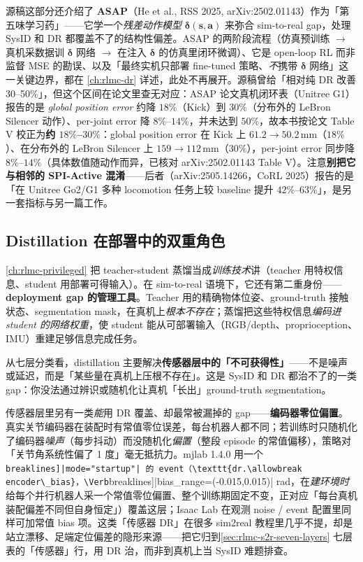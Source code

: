 源稿这部分还介绍了 \textbf{ASAP}（He et al., RSS 2025, arXiv:2502.01143）作为「第五味学习药」——它学一个\emph{残差动作模型} $\boldsymbol\delta(\mathbf s,\mathbf a)$ 来弥合 sim-to-real gap，处理 SysID 和 DR 都覆盖不了的结构性偏差。ASAP 的两阶段流程（仿真预训练 $\to$ 真机采数据训 $\boldsymbol\delta$ 网络 $\to$ 在注入 $\boldsymbol\delta$ 的仿真里闭环微调）、它是 open-loop RL 而非监督 MSE 的勘误、以及「最终实机只部署 fine-tuned 策略、\emph{不}携带 $\boldsymbol\delta$ 网络」这一关键边界，都在 \cref{ch:rlmc-dr} 详述，此处不再展开。源稿曾给「相对纯 DR 改善 30--50\%」，但这个区间在论文里查无对应：ASAP 论文真机闭环表（Unitree G1）报告的是 \emph{global position error} 约降 $18\%$（Kick）到 $30\%$（分布外的 LeBron Silencer 动作）、per-joint error 降 $8\%$--$14\%$，并未达到 $50\%$，故本书按论文 Table V 校正为\textbf{约 $18\%$--$30\%$}：global position error 在 Kick 上 $61.2\!\to\!50.2$\,mm（$18\%$）、在分布外的 LeBron Silencer 上 $159\!\to\!112$\,mm（$30\%$），per-joint error 同步降 $8\%$--$14\%$（具体数值随动作而异，已核对 arXiv:2502.01143 Table V）。注意\textbf{别把它与相邻的 SPI-Active 混淆}——后者（arXiv:2505.14266，CoRL 2025）报告的是「在 Unitree Go2/G1 多种 locomotion 任务上较 baseline 提升 $42\%$--$63\%$」，是另一套指标与另一篇工作。

\subsection{Distillation 在部署中的双重角色}
\label{sec:rlmc-s2r-distill}

\cref{ch:rlmc-privileged} 把 teacher-student 蒸馏当成\emph{训练技术}讲（teacher 用特权信息、student 用部署可得输入）。在 sim-to-real 语境下，它还有第二重身份——\textbf{deployment gap 的管理工具}。Teacher 用的精确物体位姿、ground-truth 接触状态、segmentation mask，在真机上\emph{根本不存在}；蒸馏把这些特权信息\emph{编码进 student 的网络权重}，使 student 能从可部署输入（RGB/depth、proprioception、IMU）重建足够信息完成任务。

从七层分类看，distillation 主要解决\textbf{传感器层中的「不可获得性」}——不是噪声或延迟，而是「某些量在真机上压根不存在」。这是 SysID 和 DR 都治不了的一类 gap：你没法通过辨识或随机化让真机「长出」ground-truth segmentation。

\begin{finenote}
传感器层里另有一类\emph{能}用 DR 覆盖、却最常被漏掉的 gap——\textbf{编码器零位偏置}。真实关节编码器在装配时有常值零位误差，每台机器人都不同；若训练时只随机化了编码器\emph{噪声}（每步抖动）而没随机化\emph{偏置}（整段 episode 的常值偏移），策略对「关节角系统性偏了 1 度」毫无抵抗力。mjlab 1.4.0 用一个 \Verb[breaklines]|mode="startup"| 的 event（\texttt{dr.\allowbreak encoder\_bias}，\Verb[breaklines]|bias_range=(-0.015,0.015)| rad，在\emph{建环境时}给每个并行机器人采一个常值零位偏置、整个训练期固定不变，正对应「每台真机装配偏差不同但自身恒定」）覆盖这层；Isaac Lab 在观测 noise / event 配置里同样可加常值 bias 项。这类「传感器 DR」在很多 sim2real 教程里几乎不提，却是站立漂移、足端定位偏差的隐形来源——把它归到\cref{sec:rlmc-s2r-seven-layers} 七层表的「传感器」行，用 DR 治，而非到真机上当 SysID 难题排查。
\end{finenote}

